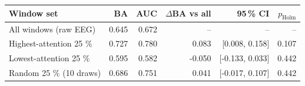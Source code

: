 \begin{tabular}{lrrrrr}
\hline
Window set & BA & AUC & $\Delta$BA vs all & 95\,\% CI & $p_{\mathrm{Holm}}$ \\
\hline
All windows (raw EEG) & 0.645 & 0.672 & -- & -- & -- \\
Highest-attention 25 \% & 0.727 & 0.780 & 0.083 & [0.008, 0.158] & 0.107 \\
Lowest-attention 25 \% & 0.595 & 0.582 & -0.050 & [-0.133, 0.033] & 0.442 \\
Random 25 \% (10 draws) & 0.686 & 0.751 & 0.041 & [-0.017, 0.107] & 0.442 \\
\hline
\end{tabular}
